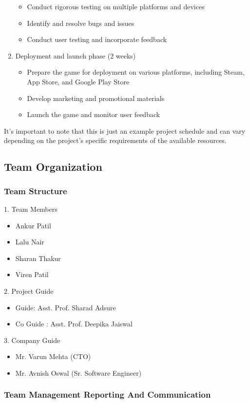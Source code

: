 \documentclass[12pt]{report}
\begin{document}
\begin{enumerate}
\begin{itemize}
\item Conduct rigorous testing on multiple platforms and devices
\item Identify and resolve bugs and issues
\item Conduct user testing and incorporate feedback
\end{itemize}
\item Deployment and launch phase (2 weeks)
\begin{itemize}
\item Prepare the game for deployment on various platforms, including Steam, App Store, and Google Play Store
\item Develop marketing and promotional materials
\item Launch the game and monitor user feedback
\end{itemize}
\end{enumerate}
It's important to note that this is just an example project schedule and can vary depending on the project's specific requirements of the available resources.

\subsection{Team Organization}
\subsubsection{Team Structure}

 1.  Team Members
\begin{itemize}
\item Ankur Patil
\item Lalu Nair
\item Sharan Thakur
\item Viren Patil
\end{itemize}
2.  Project Guide
\begin{itemize}
\item Guide: Asst. Prof. Sharad Adsure 
\item Co Guide : Asst. Prof. Deepika Jaiswal  
\end{itemize}
3.  Company Guide
\begin{itemize}
\item Mr. Varun Mehta (CTO) 
\item Mr. Avnish Oswal (Sr. Software Engineer)
\end{itemize}

\subsubsection{Team Management Reporting And Communication}
\justifying
\setlength{\parindent}{2em}
\setlength{\parskip}{0.5em}
\end{document}
